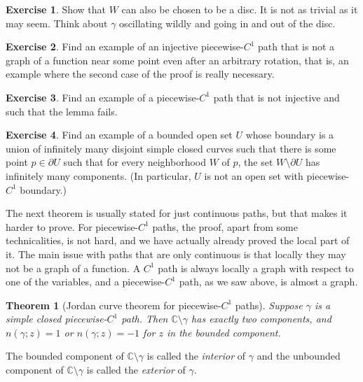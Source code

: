 \documentclass[12pt,openany]{book}
\newcommand{\C}{{\mathbb{C}}}
\theoremstyle{plain}
\newtheorem{thm}{Theorem}[section]
\theoremstyle{remark}
\theoremstyle{definition}
\newenvironment{exbox}{%
    \def\FrameCommand{\vrule width 1pt \relax\hspace{10pt}}%
    \MakeFramed{\advance\hsize-\width\FrameRestore}%
}{%
    \endMakeFramed
}
\theoremstyle{exercise}
\newtheorem{exercise}{Exercise}[section]
\theoremstyle{example}
\begin{document}
\begin{exbox}
\begin{exercise}
Show that $W$ can also be chosen to be a disc.
It is not as trivial as it may seem.
Think about $\gamma$ oscillating wildly and going in and out of the disc.
\end{exercise}

\begin{exercise}
Find an example of an injective piecewise-$C^1$ path that is not a graph of a
function near some point even after an arbitrary rotation,
that is, an example where the second case of the
proof is really necessary.
\end{exercise}

\begin{exercise}
Find an example of a piecewise-$C^1$ path that is not injective and such that
the lemma fails.
\end{exercise}

\begin{exercise}
Find an example of a bounded open set $U$ whose boundary is a union of
infinitely many disjoint simple closed curves such that there is some point
$p \in \partial U$ such that for every neighborhood $W$ of $p$,
the set $W \setminus \partial U$ has infinitely many components.
(In particular, $U$ is not an open set with piecewise-$C^1$ boundary.)
\end{exercise}
\end{exbox}

The next theorem is usually stated for just continuous paths, but that makes
it harder to prove.  For piecewise-$C^1$ paths, the proof, apart from some
technicalities, is not hard, and we have actually already proved the
local part of it.  The main issue with paths that are only continuous is that
locally they may not be a graph of a function.  A $C^1$ path is always
locally a graph with respect to one of the variables, and a piecewise-$C^1$
path, as we saw above, is almost a graph.

\begin{thm}[Jordan curve theorem for piecewise-$C^1$ paths]%
Suppose $\gamma$ is a simple closed piecewise-$C^1$ path.
Then $\C \setminus \gamma$ has exactly two components,
and $n(\gamma;z) = 1$ or 
$n(\gamma;z) = -1$ for $z$ in the bounded component.
\end{thm}

The bounded component of $\C \setminus \gamma$ is called the
\emph{interior} of $\gamma$
and the unbounded component of $\C \setminus \gamma$ is called the
\emph{exterior} of $\gamma$.
\end{document}
